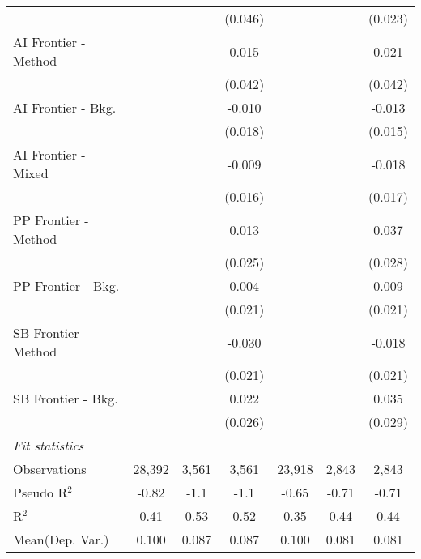 \begin{tabular}{lcccccc}
                        &             &                & (0.046) &             &              & (0.023)\\   
   AI Frontier - Method &             &                & 0.015   &             &              & 0.021\\   
                        &             &                & (0.042) &             &              & (0.042)\\   
   AI Frontier - Bkg.   &             &                & -0.010  &             &              & -0.013\\   
                        &             &                & (0.018) &             &              & (0.015)\\   
   AI Frontier - Mixed  &             &                & -0.009  &             &              & -0.018\\   
                        &             &                & (0.016) &             &              & (0.017)\\   
   PP Frontier - Method &             &                & 0.013   &             &              & 0.037\\   
                        &             &                & (0.025) &             &              & (0.028)\\   
   PP Frontier - Bkg.   &             &                & 0.004   &             &              & 0.009\\   
                        &             &                & (0.021) &             &              & (0.021)\\   
   SB Frontier - Method &             &                & -0.030  &             &              & -0.018\\   
                        &             &                & (0.021) &             &              & (0.021)\\   
   SB Frontier - Bkg.   &             &                & 0.022   &             &              & 0.035\\   
                        &             &                & (0.026) &             &              & (0.029)\\   
   \midrule
   \emph{Fit statistics}\\
   Observations         & 28,392      & 3,561          & 3,561   & 23,918      & 2,843        & 2,843\\  
   Pseudo R$^2$         & -0.82       & -1.1           & -1.1    & -0.65       & -0.71        & -0.71\\  
   R$^2$                & 0.41        & 0.53           & 0.52    & 0.35        & 0.44         & 0.44\\  
Mean(Dep. Var.) & 0.100 & 0.087 & 0.087 & 0.100 & 0.081 & 0.081 \\
   

\end{tabular}
